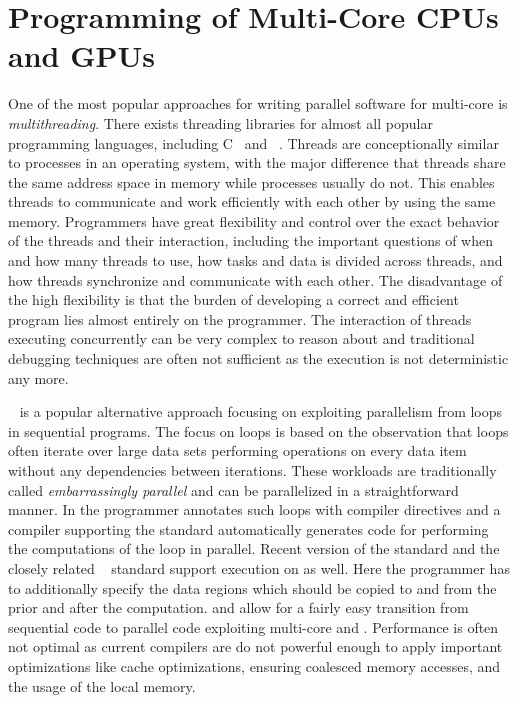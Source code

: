 \section{Programming of Multi-Core CPUs and GPUs}
One of the most popular approaches for writing parallel software for multi-core \CPUs is \emph{multithreading}.
There exists threading libraries for almost all popular programming languages, including C~\cite{Cstandard,Pthreads} and \Cpp~\cite{Cppstandard}.
Threads are conceptionally similar to processes in an operating system, with the major difference that threads share the same address space in memory while processes usually do not.
This enables threads to communicate and work efficiently with each other by using the same memory.
Programmers have great flexibility and control over the exact behavior of the threads and their interaction, including the important questions of when and how many threads to use, how tasks and data is divided across threads, and how threads synchronize and communicate with each other.
The disadvantage of the high flexibility is that the burden of developing a correct and efficient program lies almost entirely on the programmer.
The interaction of threads executing concurrently can be very complex to reason about and traditional debugging techniques are often not sufficient as the execution is not deterministic any more.

\OpenMP~\cite{OpenMP} is a popular alternative approach focusing on exploiting parallelism from loops in sequential programs.
The focus on loops is based on the observation that loops often iterate over large data sets performing operations on every data item without any dependencies between iterations.
These workloads are traditionally called \emph{embarrassingly parallel} and can be parallelized in a straightforward manner.
In \OpenMP the programmer annotates such loops with compiler directives and a compiler supporting the \OpenMP standard automatically generates code for performing the computations of the loop in parallel.
Recent version of the \OpenMP standard and the closely related \OpenACC~\cite{OpenACC} standard support execution on \GPUs as well.
Here the programmer has to additionally specify the data regions which should be copied to and from the \GPU prior and after the computation.
\OpenMP and \OpenACC allow for a fairly easy transition from sequential code to parallel code exploiting multi-core \CPUs and \GPUs.
Performance is often not optimal as  current compilers are do not powerful enough to apply important optimizations like cache optimizations, ensuring coalesced memory accesses, and the usage of the local memory.

